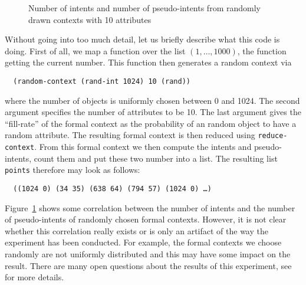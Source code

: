 \documentclass[oneside]{llncs}
\begin{document}
\begin{figure}[tp]
  \caption{Number of intents and number of pseudo-intents from randomly drawn contexts with 10 attributes}
  \label{fig:diagram-1}
\end{figure}

Without going into too much detail, let us briefly describe what this code is doing.
First of all, we map a function over the list $(1, …, 1000)$, the function getting the
current number.  This function then generates a random context via
\begin{lstlisting}
  (random-context (rand-int 1024) 10 (rand))
\end{lstlisting}
where the number of objects is uniformly chosen between 0 and 1024.  The second argument
specifies the number of attributes to be 10.  The last argument gives the ``fill-rate'' of
the formal context as the probability of an random object to have a random attribute.  The
resulting formal context is then reduced using \lstinline{reduce-context}.  From this
formal context we then compute the intents and pseudo-intents, count them and put these
two number into a list.  The resulting list \lstinline{points} therefore may look as follows:
\begin{verbatim}
  ((1024 0) (34 35) (638 64) (794 57) (1024 0) …)
\end{verbatim}

Figure~\ref{fig:diagram-1} shows some correlation between the number of intents and the
number of pseudo-intents of randomly chosen formal contexts.  However, it is not clear
whether this correlation really exists or is only an artifact of the way the experiment
has been conducted.  For example, the formal contexts we choose randomly are not uniformly
distributed and this may have some impact on the result.  There are many open questions
about the results of this experiment,
see~\cite{sage/intentsPseudointents,conf/cla/Ganter2011} for more details.
\end{document}
